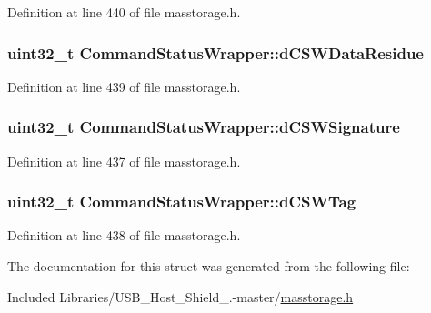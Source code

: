 \-Definition at line 440 of file masstorage.\-h.

\hypertarget{struct_command_status_wrapper_adf944665d28bb394a3d9756e8418d09e}{
\subsubsection[{d\-C\-S\-W\-Data\-Residue}]{\setlength{\rightskip}{0pt plus 5cm}uint32\-\_\-t {\bf \-Command\-Status\-Wrapper\-::d\-C\-S\-W\-Data\-Residue}}}\label{struct_command_status_wrapper_adf944665d28bb394a3d9756e8418d09e}


\-Definition at line 439 of file masstorage.\-h.

\hypertarget{struct_command_status_wrapper_a498a87759e737395829b6ff4b6420ad1}{
\subsubsection[{d\-C\-S\-W\-Signature}]{\setlength{\rightskip}{0pt plus 5cm}uint32\-\_\-t {\bf \-Command\-Status\-Wrapper\-::d\-C\-S\-W\-Signature}}}\label{struct_command_status_wrapper_a498a87759e737395829b6ff4b6420ad1}


\-Definition at line 437 of file masstorage.\-h.

\hypertarget{struct_command_status_wrapper_af872c29cfee3fb74e7ad9471ee4461fb}{
\subsubsection[{d\-C\-S\-W\-Tag}]{\setlength{\rightskip}{0pt plus 5cm}uint32\-\_\-t {\bf \-Command\-Status\-Wrapper\-::d\-C\-S\-W\-Tag}}}\label{struct_command_status_wrapper_af872c29cfee3fb74e7ad9471ee4461fb}


\-Definition at line 438 of file masstorage.\-h.



\-The documentation for this struct was generated from the following file\-:\begin{DoxyCompactItemize}
\item 
\-Included Libraries/\-U\-S\-B\-\_\-\-Host\-\_\-\-Shield\-\_.-\/master/\hyperlink{masstorage_8h}{masstorage.\-h}\end{DoxyCompactItemize}
